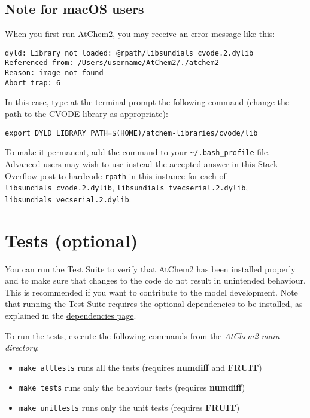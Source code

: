 \subsection{Note for macOS users} \label{subsec:note-for-macos-users}

When you first run AtChem2, you may receive an error message like
this:

\begin{verbatim}
dyld: Library not loaded: @rpath/libsundials_cvode.2.dylib
Referenced from: /Users/username/AtChem2/./atchem2
Reason: image not found
Abort trap: 6
\end{verbatim}

In this case, type at the terminal prompt the following command
(change the path to the CVODE library as appropriate):

\begin{verbatim}
export DYLD_LIBRARY_PATH=$(HOME)/atchem-libraries/cvode/lib
\end{verbatim}

To make it permanent, add the command to your
\texttt{\textasciitilde{}/.bash\_profile} file. Advanced users may
wish to use instead the accepted answer in
\href{https://stackoverflow.com/questions/17703510/dyld-library-not-loaded-reason-image-not-loaded}{this
  Stack Overflow post} to hardcode \texttt{rpath} in this instance for
each of \texttt{libsundials\_cvode.2.dylib},
\texttt{libsundials\_fvecserial.2.dylib},
\texttt{libsundials\_vecserial.2.dylib}.

\section{Tests (optional)} \label{sec:tests}

You can run the \hyperref[sec:testsuite]{Test Suite} to verify that
AtChem2 has been installed properly and to make sure that changes to
the code do not result in unintended behaviour. This is recommended if
you want to contribute to the model development. Note that running the
Test Suite requires the optional dependencies to be installed, as
explained in the \hyperref[sec:dependencies]{dependencies page}.

To run the tests, execute the following commands from the
\emph{AtChem2 main directory}:

\begin{itemize}
\item \texttt{make\ alltests} runs all the tests (requires
  \textbf{numdiff} and \textbf{FRUIT})
\item \texttt{make\ tests} runs only the behaviour tests (requires
  \textbf{numdiff})
\item \texttt{make\ unittests} runs only the unit tests (requires
  \textbf{FRUIT})
\end{itemize}

